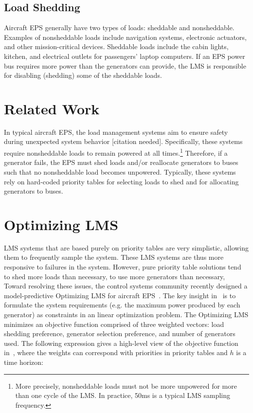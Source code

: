 \documentclass{acm_proc_article-sp}
\begin{document}
\subsection{Load Shedding}
Aircraft EPS generally have two types of loads: sheddable and nonsheddable.
Examples of nonsheddable loads include navigation systems, electronic actuators, and other mission-critical devices.
Sheddable loads include the cabin lights, kitchen, and electrical outlets for passengers' laptop computers.
If an EPS power bus requires more power than the generators can provide, the LMS is responsible for disabling (shedding) some of the sheddable loads.

\section{Related Work}
\label{sec:related-work}
In typical aircraft EPS, the load management systems aim to ensure safety during unexpected system behavior [citation needed].
Specifically, these systems require nonsheddable loads to remain powered at all times.\footnote{More precisely, nonsheddable loads must not be more unpowered for more than one cycle of the LMS. In practice, 50ms is a typical LMS sampling frequency.} %
Therefore, if a generator fails, the EPS must shed loads and/or reallocate generators to buses such that no nonsheddable load becomes unpowered.
Typically, these systems rely on hard-coded priority tables for selecting loads to shed and for allocating generators to buses.

\section{Optimizing LMS}
\label{sec:optimizing-LMS}
LMS systems that are based purely on priority tables are very simplistic, allowing them to frequently sample the system. 
These LMS systems are thus more responsive to failures in the system.
However, pure priority table solutions tend to shed more loads than necessary, to use more generators than necessary, 
Toward resolving these issues, the control systems community recently designed a model-predictive Optimizing LMS for aircraft EPS~\cite{mehdi}.
The key insight in~\cite{mehdi} is to formulate the system requirements (e.g. the maximum power produced by each generator) as constraints in an linear optimization problem.
The Optimizing LMS minimizes an objective function comprised of three weighted vectors: load shedding preference, generator selection preference, and number of generators used.
The following expression gives a high-level view of the objective function in~\cite{mehdi}, where the weights can correspond with priorities in priority tables and $h$ is a time horizon:
\end{document}
